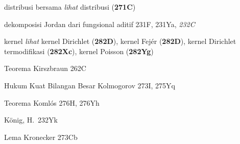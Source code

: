distribusi bersama {\it lihat} distribusi ({\bf 271C})




dekomposisi Jordan dari fungsional aditif 231F, 231Ya,
{\it 232C}



\indexmedskip





































kernel 
  {\it lihat}
kernel Dirichlet ({\bf 282D}), kernel Fej\'er ({\bf 282D}),
kernel Dirichlet termodifikasi ({\bf 282Xc}),
kernel Poisson ({\bf 282Yg})






Teorema Kirszbraun 262C











Hukum Kuat Bilangan Besar Kolmogorov 273I, 275Yq







Teorema Koml\'os 276H, 276Yh


K\"onig, H.\ 232Yk








\indexheader{\Krein}




Lema Kronecker 273Cb

















